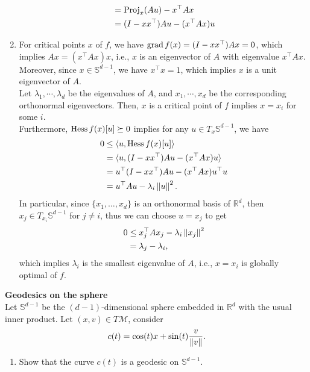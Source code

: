 \documentclass[en, oneside]{assignment}
\begin{document}
\begin{sol}
\begin{enumerate}[label=(\arabic*)]
\begin{align*}
            &= \operatorname{Proj}_x(A u) - x^\top A x\\
            &= (I - x x^\top) A u - (x^\top A x) u
        \end{align*}
        \item For critical points $x$ of $f$, we have $\operatorname{grad} f(x) = (I - x x^\top) A x = 0$, which implies $A x = (x^\top A x) x$,
        i.e., $x$ is an eigenvector of $A$ with eigenvalue $x^\top A x$. Moreover, since $x \in \mathbb{S}^{d-1}$, we have $x^\top x = 1$, 
        which implies $x$ is a unit eigenvector of $A$.\\
        Let $\lambda_1, \cdots, \lambda_d$ be the eigenvalues of $A$, and $x_1, \cdots, x_d$ be the corresponding orthonormal eigenvectors.
        Then, $x$ is a critical point of $f$ implies $x = x_i$ for some $i$.\\
        Furthermore, $\operatorname{Hess} f(x)[u] \succeq 0$ implies for any $u \in T_x\mathbb{S}^{d-1}$, we have
        \begin{align*}
            0 &\leq \langle u, \operatorname{Hess} f(x)[u] \rangle\\
            &= \langle u, (I - x x^\top) A u - (x^\top A x) u \rangle\\
            &= u^\top (I - x x^\top) A u - (x^\top A x) u^\top u\\
            &= u^\top A u - \lambda_i \left\lVert u\right\rVert^2.
        \end{align*}
        In particular, since $\{x_1, \ldots, x_d\}$ is an orthonormal basis of $\mathbb{R}^d$, 
        then $x_j \in T_{x_i}\mathbb{S}^{d-1}$ for $j \neq i$, thus we can choose $u = x_j$ to get
        \begin{align*}
            0 &\leq x_j^\top A x_j - \lambda_i \left\lVert x_j\right\rVert^2\\
            &= \lambda_j - \lambda_i,
        \end{align*}
        which implies $\lambda_i$ is the smallest eigenvalue of $A$, i.e., $x = x_i$ is globally optimal of $f$.
    \end{enumerate}
 \end{sol}

 \begin{prob} \textbf{Geodesics on the sphere}\\
    Let $\mathbb{S}^{d-1}$ be the $(d-1)$-dimensional sphere embedded in $\mathbb{R}^d$ with the usual inner product. 
    Let $(x, v) \in T\mathcal{M}$, consider
    \begin{equation*}
        c(t) = \cos(t) x + \sin(t) \frac{v}{\left\lVert v\right\rVert}.
    \end{equation*}
    \begin{enumerate}[label=(\arabic*)]
        \item Show that the curve $c(t)$ is a geodesic on $\mathbb{S}^{d-1}$.
    \end{enumerate}
 \end{prob}
\end{document}
